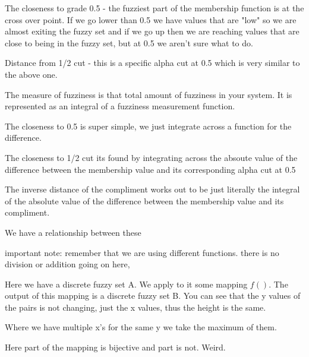 \documentclass{article}
\begin{document}

The closeness to grade 0.5 - the fuzziest part of the membership function is at the cross over point. If we go lower than 0.5 we have values that are "low" so we are almost exiting the fuzzy set and if we go up then we are reaching values that are close to being in the fuzzy set, but at 0.5 we aren't sure what to do.

Distance from 1/2 cut - this is a specific alpha cut at 0.5 which is very similar to the above one.


The measure of fuzziness is that total amount of fuzziness in your system. It is represented as an integral of a fuzziness measurement function.

The closeness to 0.5 is super simple, we just integrate across a function for the difference.

The closeness to 1/2 cut its found by integrating across the absoute value of the difference between the membership value and its corresponding alpha cut at 0.5

The inverse distance of the compliment works out to be just literally the integral of the absolute value of the difference between the membership value and its compliment.

We have a relationship between these


important note: remember that we are using different functions. there is no division or addition going on here,

Here we have a discrete fuzzy set A. We apply to it some mapping $f()$. The output of this mapping is a discrete fuzzy set B. You can see that the y values of the pairs is not changing, just the x values, thus the height is the same.

Where we have multiple x's for the same y we take the maximum of them.



Here part of the mapping is bijective and part is not. Weird.
\end{document}
